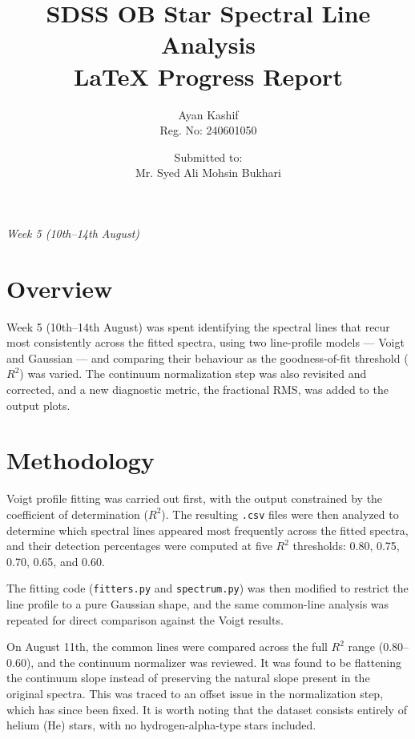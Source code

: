 \documentclass[12pt]{article}
\title{\textbf{SDSS OB Star Spectral Line Analysis}\\
\large LaTeX Progress Report}
\author{Ayan Kashif \\ \small Reg. No: 240601050}
\date{Submitted to:\\Mr. Syed Ali Mohsin Bukhari}
\begin{document}
\maketitle
\thispagestyle{empty}

\begin{center}
\textit{ Week 5 (10th--14th August)}
\end{center}

\clearpage
\tableofcontents
\clearpage
\listoftables
\clearpage


\section{Overview}
\label{sec:overview}

Week 5 (10th--14th August) was spent identifying the spectral lines that recur most consistently across the fitted spectra, using two line-profile models --- Voigt and Gaussian --- and comparing their behaviour as the goodness-of-fit threshold ($R^2$) was varied. The continuum normalization step was also revisited and corrected, and a new diagnostic metric, the fractional RMS, was added to the output plots.

\section{Methodology}
\label{sec:methodology}

Voigt profile fitting was carried out first, with the output constrained by the coefficient of determination ($R^2$). The resulting \texttt{.csv} files were then analyzed to determine which spectral lines appeared most frequently across the fitted spectra, and their detection percentages were computed at five $R^2$ thresholds: 0.80, 0.75, 0.70, 0.65, and 0.60.

The fitting code (\texttt{fitters.py} and \texttt{spectrum.py}) was then modified to restrict the line profile to a pure Gaussian shape, and the same common-line analysis was repeated for direct comparison against the Voigt results.

On August 11th, the common lines were compared across the full $R^2$ range (0.80--0.60), and the continuum normalizer was reviewed. It was found to be flattening the continuum slope instead of preserving the natural slope present in the original spectra. This was traced to an offset issue in the normalization step, which has since been fixed. It is worth noting that the dataset consists entirely of helium (He) stars, with no hydrogen-alpha-type stars included.
\end{document}
